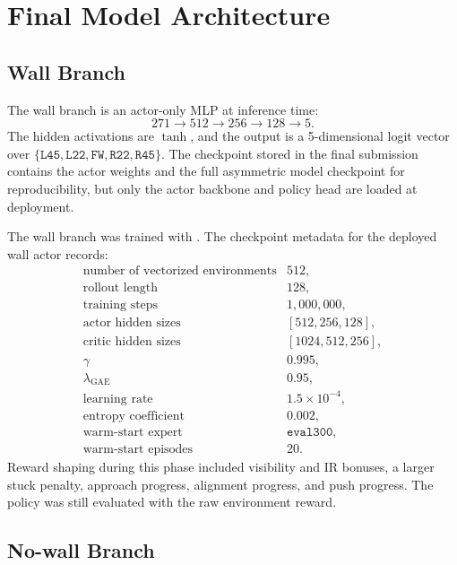 \documentclass[11pt]{article}
\begin{document}
\section{Final Model Architecture}

\subsection{Wall Branch}

The wall branch is an actor-only MLP at inference time:
\[
  271 \rightarrow 512 \rightarrow 256 \rightarrow 128 \rightarrow 5.
\]
The hidden activations are \(\tanh\), and the output is a 5-dimensional logit vector
over \(\{\texttt{L45},\texttt{L22},\texttt{FW},\texttt{R22},\texttt{R45}\}\).
The checkpoint stored in the final submission contains the actor weights and the full
asymmetric model checkpoint for reproducibility, but only the actor backbone and policy
head are loaded at deployment.

The wall branch was trained with .  The checkpoint
metadata for the deployed wall actor records:
\[
\begin{array}{ll}
\text{number of vectorized environments} & 512,\\
\text{rollout length} & 128,\\
\text{training steps} & 1{,}000{,}000,\\
\text{actor hidden sizes} & [512,256,128],\\
\text{critic hidden sizes} & [1024,512,256],\\
\gamma & 0.995,\\
\lambda_{\text{GAE}} & 0.95,\\
\text{learning rate} & 1.5\times 10^{-4},\\
\text{entropy coefficient} & 0.002,\\
\text{warm-start expert} & \texttt{eval300},\\
\text{warm-start episodes} & 20.
\end{array}
\]
Reward shaping during this phase included visibility and IR bonuses, a larger stuck
penalty, approach progress, alignment progress, and push progress.  The policy was
still evaluated with the raw environment reward.

\subsection{No-wall Branch}
\end{document}
